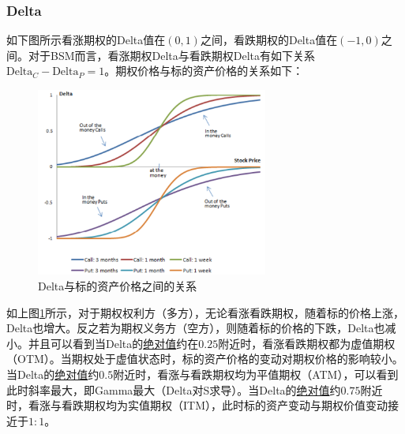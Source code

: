 \documentclass[11pt]{article}
\begin{document}
\subsubsection{Delta}

如下图所示看涨期权的Delta值在$(0,1)$之间，看跌期权的Delta值在$(-1,0)$之间。对于BSM而言，看涨期权Delta与看跌期权Delta有如下关系$\text{Delta}_C - \text{Delta}_P = 1$。期权价格与标的资产价格的关系如下：
\begin{figure}[H]
    \centering
    \includegraphics[width=0.68\textwidth]{fig/delta-stock.png}
    \caption{Delta与标的资产价格之间的关系}
    \label{fig:delta-stock}
\end{figure}

如上图\ref{fig:delta-stock}所示，对于期权权利方（多方），无论看涨看跌期权，随着标的价格上涨，Delta也增大。反之若为期权义务方（空方），则随着标的价格的下跌，Delta也减小。并且可以看到当Delta的\uline{绝对值}约在$0.25$附近时，看涨看跌期权都为虚值期权（OTM）。当期权处于虚值状态时，标的资产价格的变动对期权价格的影响较小。当Delta的\uline{绝对值}约$0.5$附近时，看涨与看跌期权均为平值期权（ATM），可以看到此时斜率最大，即Gamma最大（Delta对S求导）。当Delta的\uline{绝对值}约$0.75$附近时，看涨与看跌期权均为实值期权（ITM），此时标的资产变动与期权价值变动接近于$1:1$。
\end{document}
